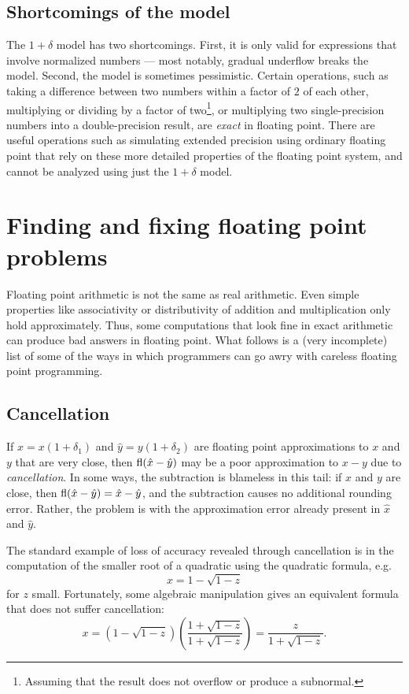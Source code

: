 \documentclass[12pt, leqno]{article} %
\begin{document}
\subsection{Shortcomings of the model}

The $1+\delta$ model has two shortcomings.  First, it is only valid
for expressions that involve normalized numbers --- most notably,
gradual underflow breaks the model.  Second, the model is sometimes
pessimistic.  Certain operations, such as taking a difference between
two numbers within a factor of $2$ of each other, multiplying or
dividing by a factor of two\footnote{Assuming that the result
does not overflow or produce a subnormal.}, or multiplying two
single-precision numbers into a double-precision result,
are {\em exact} in floating point.  There are useful operations
such as simulating extended precision using ordinary floating point
that rely on these more detailed properties of the floating point system,
and cannot be analyzed using just the $1+\delta$ model.

\section{Finding and fixing floating point problems}

Floating point arithmetic is not the same as real arithmetic.  Even
simple properties like associativity or distributivity of addition and
multiplication only hold approximately.  Thus, some computations that
look fine in exact arithmetic can produce bad answers in floating
point.  What follows is a (very incomplete) list of some of the ways
in which programmers can go awry with careless floating point
programming.

\subsection{Cancellation}

If $\hat{x} = x(1+\delta_1)$ and $\hat{y} = y(1+\delta_2)$ are
floating point approximations to $x$ and $y$ that are very close, then
$\operatorname{fl}(\hat{x}-\hat{y})$ may be a poor approximation to $x-y$ due to
{\em cancellation}.  In some ways, the subtraction is blameless in
this tail: if $x$ and $y$ are close, then $\operatorname{fl}(\hat{x}-\hat{y}) =
\hat{x}-\hat{y}$, and the subtraction causes no additional rounding
error.  Rather, the problem is with the approximation error already
present in $\hat{x}$ and $\hat{y}$.

The standard example of loss of accuracy revealed through cancellation
is in the computation of the smaller root of a quadratic using the
quadratic formula, e.g.
\[
  x = 1-\sqrt{1-z}
\]
for $z$ small.  Fortunately, some algebraic manipulation gives an
equivalent formula that does not suffer cancellation:
\[
  x =
    \left( 1-\sqrt{1-z} \right)
    \left(\frac{1+\sqrt{1-z}}{1+\sqrt{1-z}}\right)
  =
    \frac{z}{1+\sqrt{1-z}}.
\]
\end{document}
